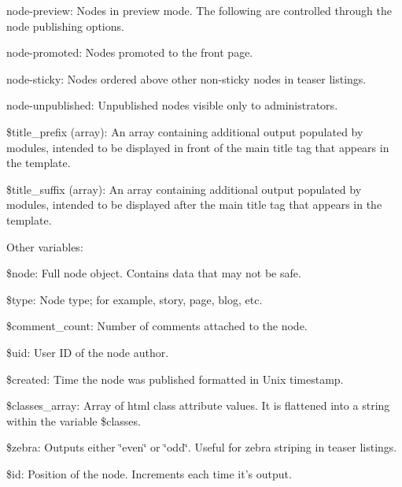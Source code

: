 \begin{DoxyItemize}
\begin{DoxyItemize}
\item node-\/preview: Nodes in preview mode. The following are controlled through the node publishing options.
\item node-\/promoted: Nodes promoted to the front page.
\item node-\/sticky: Nodes ordered above other non-\/sticky nodes in teaser listings.
\item node-\/unpublished: Unpublished nodes visible only to administrators.
\end{DoxyItemize}
\item \$title\_\-prefix (array): An array containing additional output populated by modules, intended to be displayed in front of the main title tag that appears in the template.
\item \$title\_\-suffix (array): An array containing additional output populated by modules, intended to be displayed after the main title tag that appears in the template.
\end{DoxyItemize}

Other variables:
\begin{DoxyItemize}
\item \$node: Full node object. Contains data that may not be safe.
\item \$type: Node type; for example, story, page, blog, etc.
\item \$comment\_\-count: Number of comments attached to the node.
\item \$uid: User ID of the node author.
\item \$created: Time the node was published formatted in Unix timestamp.
\item \$classes\_\-array: Array of html class attribute values. It is flattened into a string within the variable \$classes.
\item \$zebra: Outputs either \char`\"{}even\char`\"{} or \char`\"{}odd\char`\"{}. Useful for zebra striping in teaser listings.
\item \$id: Position of the node. Increments each time it's output.
\end{DoxyItemize}

